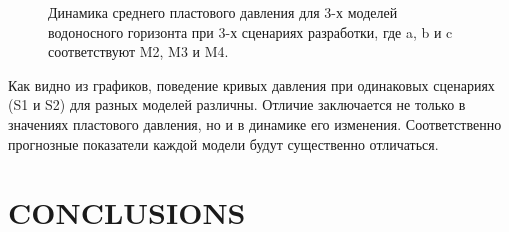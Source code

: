 \documentclass{article}
\begin{document}
\begin{figure}
{\begin{minipage}[h]{0.32\linewidth}
    \end{minipage} 
    \caption{Динамика среднего пластового давления для 3-х моделей водоносного горизонта при 3-х сценариях разработки, где a, b и c соответствуют M2, M3 и M4.}
    \label{fig:2din}
    }
\end{figure}
Как видно из графиков, поведение кривых давления при одинаковых сценариях (S1 и S2) для разных моделей различны. Отличие заключается не только в значениях пластового давления, но и в динамике его изменения. Соответственно прогнозные показатели каждой модели будут существенно отличаться.

\section{CONCLUSIONS}
\end{document}
